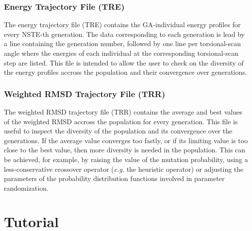 \documentclass[10pt,a4paper]{report}
\numberwithin{equation}{section}
\begin{document}
\subsection{Energy Trajectory File (TRE)}
\label{sec:file-formats-TRE}

The energy trajectory file (TRE) contains the GA-individual energy
profiles for every NSTE-th generation.  The data corresponding to each
generation is lead by a line containing the generation number,
followed by one line per torsional-scan angle where the energies of
each individual at the corresponding torsional-scan step are listed.
This file is intended to allow the user to check on the diversity of
the energy profiles accross the population and their convergence over
generations.

\subsection{Weighted RMSD Trajectory File (TRR)}
\label{sec:file-formats-TRR}

The weighted RMSD trajectory file (TRR) contains the average and best
values of the weighted RMSD accross the population for every
generation.  This file is useful to inspect the diversity of the
population and its convergence over the generations. If the average
value converges too fastly, or if its limiting value is too close to
the best value, then more diversity is needed in the population.  This
can be achieved, for example, by raising the value of the mutation
probability, using a less-conservative crossover operator
(\textit{e.g.} the heuristic operator) or adjusting the parameters of
the probability distribution functions involved in parameter
randomization.

\chapter{Tutorial}
\label{chap:tutorial}
 
\end{document}
